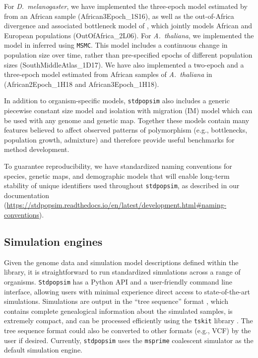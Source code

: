 \documentclass[12pt,halfline,a4paper]{ouparticle}
\newcommand{\Stdpopsim}{\texttt{Stdpopsim}\xspace}
\newcommand{\stdpopsim}{\texttt{stdpopsim}\xspace}
\newcommand{\MSMC}{\texttt{MSMC}\xspace}
\newcommand{\tskit}{\texttt{tskit}\xspace}
\begin{document}
For \textit{D.~melanogaster}, we have implemented the three-epoch model estimated by \cite{sheehan2016deep} from
an African sample (African3Epoch\_1S16), as well as the out-of-Africa divergence
and associated bottleneck model of \cite{li2006inferring}, which jointly models African
and European populations (OutOfAfrica\_2L06). For \textit{A.~thaliana}, we implemented the
model in \cite{durvasula2017african} inferred using \MSMC. This model includes
a continuous change in population size over time, rather than pre-specified epochs of different
population sizes (SouthMiddleAtlas\_1D17). We have also implemented a two-epoch and a three-epoch model estimated from African
samples of \textit{A.~thaliana} in \cite{huber2018gene} (African2Epoch\_1H18 and African3Epoch\_1H18).

In addition to organism-specific models, \stdpopsim also includes a generic piecewise constant size model and
isolation with migration (IM) model which can be used with any genome and genetic map. 
Together these models
contain many features believed to affect observed patterns of polymorphism (e.g., bottlenecks, population growth,
admixture) and therefore provide useful benchmarks for method development.



To guarantee reproducibility,
we have standardized naming
conventions for species, genetic maps, and demographic models that will enable long-term stability
of unique identifiers used throughout \stdpopsim,
as described in our documentation
(\url{https://stdpopsim.readthedocs.io/en/latest/development.html#naming-conventions}).

 \subsection*{Simulation engines}

Given the genome data and simulation model descriptions defined within the
library, it is straightforward to run standardized simulations
across a range of organisms. \Stdpopsim has a Python API and a user-friendly
command line interface, allowing users with minimal experience direct access to
state-of-the-art simulations. Simulations are output in the ``tree sequence''
format \citep{kelleher2016efficient,kelleher2018efficient,kelleher2019inferring}, which
contains complete genealogical information about the simulated samples, is
extremely compact, and can be processed efficiently using the \tskit library
\citep{kelleher2016efficient,kelleher2018efficient}.
The tree sequence format could also be converted
to other formats (e.g., VCF) by the user if desired.
Currently, \stdpopsim uses the  \texttt{msprime} coalescent simulator \citep{kelleher2016efficient}
as the default simulation engine.
\end{document}
